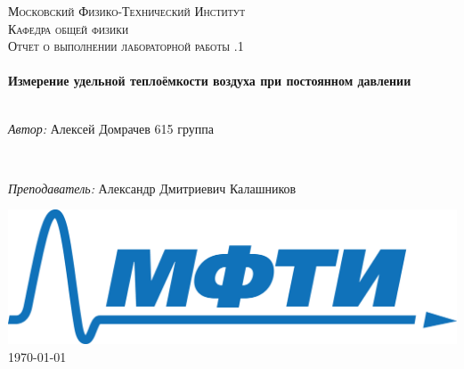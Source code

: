 
	\begin{titlepage}
		
		
		
		\center %
		
		
		
		
		\textsc{\LARGE Московский Физико-Технический Институт}\\[1,5cm] %
		\textsc{\Large Кафедра общей физики}\\[0.5cm]
		\textsc{\large Отчет о выполнении лабораторной работы .1}\\[0.5cm] %
		
		
		\HRule
		\\[0.4cm]
		{ \huge \bfseries Измерение удельной теплоёмкости воздуха при постоянном давлении}
		\\[0.2cm] %
		\HRule
		\\[1.5cm]
		
		
		
		
		\begin{minipage}{0.7\textwidth}
			\begin{center} \large
				\emph{Автор:} Алексей \textsf{Домрачев} 615 группа
			\end{center}
		\end{minipage}
		\\[1.0cm]
		\begin{minipage}{0.9\textwidth}
			\begin{center} \large
				\emph{Преподаватель:} Александр Дмитриевич \textsf{Калашников} %
			\end{center}
		\end{minipage}
		\vfill 
			\includegraphics[width = 80 mm]{logo.png}	\\[1,0cm]
			{\large \today}
		
	\end{titlepage}

